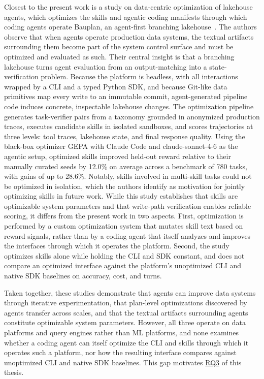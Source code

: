 \documentclass[
english,                 %
bibtex,                  %
]{kththesis}
\numberwithin{listing}{chapter}
\begin{document}
Closest to the present work is a study on data-centric optimization of lakehouse agents, which optimizes the skills and agentic coding manifests through which coding agents operate Bauplan, an agent-first branching lakehouse~\cite{schneider_skill_2026}. The authors observe that when agents operate production data systems, the textual artifacts surrounding them become part of the system control surface and must be optimized and evaluated as such. Their central insight is that a branching lakehouse turns agent evaluation from an output-matching into a state-verification problem. Because the platform is headless, with all interactions wrapped by a \gls{CLI} and a typed Python \gls{SDK}, and because Git-like data primitives map every write to an immutable commit, agent-generated pipeline code induces concrete, inspectable lakehouse changes. The optimization pipeline generates task-verifier pairs from a taxonomy grounded in anonymized production traces, executes candidate skills in isolated sandboxes, and scores trajectories at three levels: tool traces, lakehouse state, and final response quality. Using the black-box optimizer \gls{GEPA} with Claude Code and claude-sonnet-4-6 as the agentic setup, optimized skills improved held-out reward relative to their manually curated seeds by 12.0\% on average across a benchmark of 780 tasks, with gains of up to 28.6\%. Notably, skills involved in multi-skill tasks could not be optimized in isolation, which the authors identify as motivation for jointly optimizing skills in future work. While this study establishes that skills are optimizable system parameters and that write-path verification enables reliable scoring, it differs from the present work in two aspects. First, optimization is performed by a custom optimization system that mutates skill text based on reward signals, rather than by a coding agent that itself analyzes and improves the interfaces through which it operates the platform. Second, the study optimizes skills alone while holding the \gls{CLI} and \gls{SDK} constant, and does not compare an optimized interface against the platform's unoptimized \gls{CLI} and native \gls{SDK} baselines on accuracy, cost, and turns.

Taken together, these studies demonstrate that agents can improve data systems through iterative experimentation, that plan-level optimizations discovered by agents transfer across scales, and that the textual artifacts surrounding agents constitute optimizable system parameters. However, all three operate on data platforms and query engines rather than \gls{ML} platforms, and none examines whether a coding agent can itself optimize the \gls{CLI} and skills through which it operates such a platform, nor how the resulting interface compares against unoptimized \gls{CLI} and native \gls{SDK} baselines. This gap motivates \hyperref[rq3]{RQ3} of this thesis.
\end{document}
